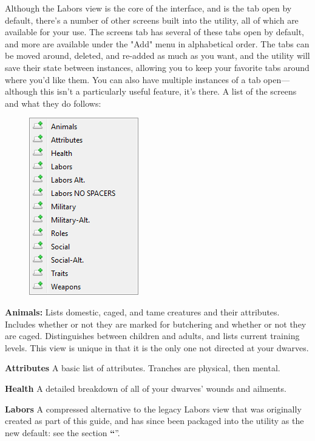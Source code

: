 \documentclass[]{article}
\newcommand{\jump}[1] {\textbf{``\nameref{sec:#1}}''}
\newcommand{\boldlist}[1] {
\vspace{12pt}
\noindent \textbf{#1}
}
\begin{document}
Although the Labors view is the core of the interface, and is the tab open by default, there's a number
of other screens built into the utility, all of which are available for your use. The screens tab has
several of these tabs open by default, and more are available under the "Add" menu in alphabetical order.
The tabs can be moved around, deleted, and re-added as much as you want, and the utility will save their
state between instances, allowing you to keep your favorite tabs around where you'd like them. You can
also have multiple instances of a tab open---although this isn't a particularly useful feature, it's
there. A list of the screens and what they do follows:

\begin{figure}
\vspace{-10pt}
  \begin{center}
    \includegraphics{Sec1Fig10}
  \end{center}
\vspace{-70pt}
\end{figure}
\noindent\textbf{Animals:} Lists domestic, caged, and tame creatures and their attributes. Includes
whether or not they are marked for butchering and whether or not they are caged. Distinguishes between
children and adults, and lists current training levels. This view is unique in that it is the only one
not directed at your dwarves.


\boldlist{Attributes} A basic list of attributes. Tranches are physical, then mental.


\boldlist{Health} A detailed breakdown of all of your dwarves' wounds and ailments.


\boldlist{Labors} A compressed alternative to the legacy Labors view that was originally created
as part of this guide, and has since been packaged into the utility as the new default: see the section
\jump{Creating Your Own Grid Views}.
\end{document}
